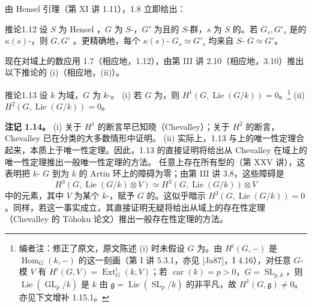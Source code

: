 由 Hensel 引理（第 XI 讲 1.11），1.8 立即给出：
\begin{SGAresult}{推论}{1.12}
设 $S$ 为 Hensel ，$G$ 为 $S$-，$G'$ 为且的 $S$-群，$s$ 为 $S$ 的。若 $G_s,G'_s$ 是的 $\kappa(s)$-，则 $G,G'$ 。更精确地，每个 $\kappa(s)$- $G_s\simeq G'_s$ 均来自 $S$- $G\simeq G'$。
\end{SGAresult}
现在对域上的数应用 1.7（相应地，1.12），由第 III 讲 2.10（相应地，3.10）推出以下推论的 (i)（相应地，(ii)）。
\begin{SGAresult}{推论}{1.13}
设 $k$ 为域，$G$ 为 $k$-。
(i) 若 $G$ 为，则 $H^1(G,\operatorname{Lie}(G/k))=0$。\footnote[6]{编者注：修正了原文，原文陈述 (i) 时未假设 $G$ 为。由 $H^i(G,-)$ 是 $\operatorname{Hom}_G(k,-)$ 的这一刻画（第 I 讲 5.3.1，亦见 [Ja87]，I 4.16），对任意 $G$-模 $V$ 有 $H^i(G,V)=\operatorname{Ext}^i_G(k,V)$；若 $\operatorname{car}(k)=p>0$，$G=\operatorname{SL}_{p,k}$，则 $\operatorname{Lie}(\operatorname{GL}_p/k)$ 是 $k$ 由 $\mathfrak g=\operatorname{Lie}(\operatorname{SL}_p/k)$ 的非平凡，故 $H^1(G,\mathfrak g)\ne0$。亦见下文增补 1.15.1。}
(ii) $H^2(G,\operatorname{Lie}(G/k))=0$。
\end{SGAresult}
\textbf{注记 1.14。} (i) 关于 $H^1$ 的断言早已知晓（Chevalley）；关于 $H^2$ 的断言，Chevalley 已在分类的大多数情形中证明。
(ii) 实际上，1.13 与上的唯一性定理合起来，本质上于唯一性定理。因此，1.13 的直接证明将给出从 Chevalley 在域上的唯一性定理推出一般唯一性定理的方法。
任意上存在所有型的（第 XXV 讲），这表明把 $k$- $G$ 到为 $k$ 的 Artin 环上的障碍为零；由第 III 讲 3.8，这些障碍是
\[H^3(G,\operatorname{Lie}(G/k)\otimes V)\simeq H^3(G,\operatorname{Lie}(G/k))\otimes V\]
中的元素，其中 $V$ 为某个 $k$-，赋予 $G$ 的。这似乎暗示 $H^3(G,\operatorname{Lie}(G/k))=0$。同样，若这一事实成立，其直接证明无疑将给出从域上的存在性定理（Chevalley 的 Tôhoku 论文）推出一般存在性定理的方法。
